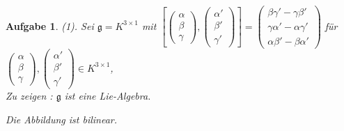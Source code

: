 \documentclass[12pt,leqno,twoside]{book}
\newcommand{\g}{\mathfrak g}
\newtheorem{AG}{Aufgabe}
\begin{document}
\begin{AG}
\rm
(1). Sei $\g=K^{3\times1}$ mit $\left[\left(\begin{array}{c} \alpha \\ \beta \\ \gamma \end{array}\right),\left(\begin{array}{c} \alpha' \\ \beta' \\ \gamma' \end{array}\right)\right]=\left(\begin{array}{c} \beta\gamma'-\gamma\beta' \\ \gamma\alpha'-\alpha\gamma' \\ \alpha\beta'-\beta\alpha' \end{array}\right)$ f\"{u}r $\left(\begin{array}{c} \alpha \\ \beta \\ \gamma \end{array}\right),\left(\begin{array}{c} \alpha' \\ \beta' \\ \gamma' \end{array}\right)\in K^{3\times1}$, 
\\Zu zeigen : $\g$ ist eine Lie-Algebra.

Die Abbildung ist bilinear.


\end{AG}
\end{document}
